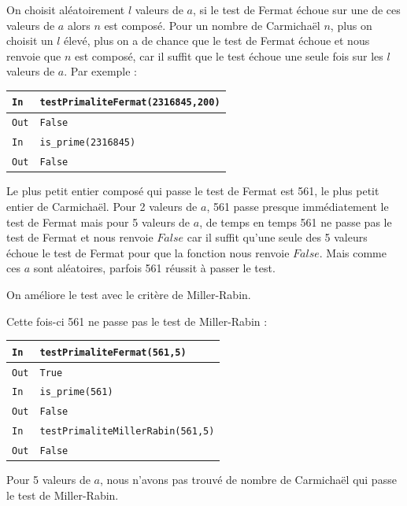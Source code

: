 \documentclass[titlepage]{article}
\begin{document}
    

    On choisit aléatoirement $l$ valeurs de $a$, si le test de Fermat échoue sur une de ces valeurs de $a$ alors
    $n$ est composé. Pour un nombre de Carmichaël $n$, plus on choisit un $l$ élevé, plus on a de chance que le test
    de Fermat échoue et nous renvoie que $n$ est composé, car il suffit que le test échoue une seule fois sur les $l$ 
    valeurs de $a$. \bigbreak
    Par exemple : \bigbreak

    \begin{tabularx}{12cm}{|p{0.60cm}|X|}
        \hline
        \rowcolor{gray}
        \texttt{In}
        & 
        \texttt{testPrimaliteFermat(2316845,200)}
        \\
        \hline
        \texttt{Out}
        &
        \texttt{False}
        \\
        \hline
        \rowcolor{gray}
        \texttt{In}
        & 
        \texttt{is\_prime(2316845)}
        \\
        \hline
        \texttt{Out}
        &
        \texttt{False}
        \\
        \hline
    \end{tabularx}
    \bigbreak

    Le plus petit entier composé qui passe le test de Fermat est 561, le plus petit entier de Carmichaël.
    Pour 2 valeurs de $a$, 561 passe presque immédiatement le test de Fermat mais pour 5 valeurs de $a$, 
    de temps en temps 561 ne passe pas le test de Fermat et nous renvoie $False$ car il suffit qu'une seule
    des 5 valeurs échoue le test de Fermat pour que la fonction nous renvoie $False$. Mais comme ces $a$
    sont aléatoires, parfois 561 réussit à passer le test.\newline

    On améliore le test avec le critère de Miller-Rabin.

    

    Cette fois-ci 561 ne passe pas le test de Miller-Rabin : \bigbreak

    \begin{tabularx}{12cm}{|p{0.60cm}|X|}
        \hline
        \rowcolor{gray}
        \texttt{In}
        & 
        \texttt{testPrimaliteFermat(561,5)}
        \\
        \hline
        \texttt{Out}
        &
        \texttt{True}
        \\
        \hline
        \rowcolor{gray}
        \texttt{In}
        & 
        \texttt{is\_prime(561)}
        \\
        \hline
        \texttt{Out}
        &
        \texttt{False}
        \\
        \hline
        \rowcolor{gray}
        \texttt{In}
        & 
        \texttt{testPrimaliteMillerRabin(561,5)}
        \\
        \hline
        \texttt{Out}
        &
        \texttt{False}
        \\
        \hline
        
    \end{tabularx}
    \bigbreak

    Pour 5 valeurs de $a$, nous n'avons pas trouvé de nombre de Carmichaël qui passe le test de Miller-Rabin.
\end{document}

